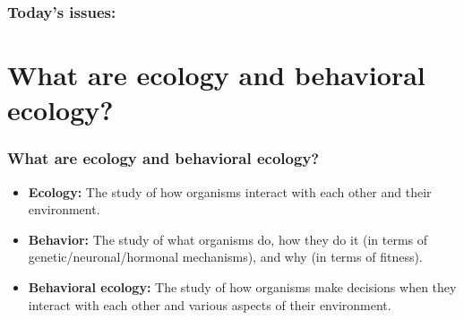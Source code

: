 \begin{noheadline}
\begin{frame}
\frametitle{Today's issues:}
\vspace{5mm}
\tableofcontents
\end{frame}
\end{noheadline}

\section[What are ecology and behavioral ecology?]{What are ecology and
    behavioral ecology?}

\begin{noheadline}
\begin{frame}[t]
    \frametitle{What are ecology and behavioral ecology?}
    \begin{adjustwidth}{-2em}{-1.5em}

        \begin{itemize}
            \item<1-> \textbf{Ecology:} The study of how organisms interact
                with each other and their environment.

                \vspace{4mm}
            \item<2-> \textbf{Behavior:} The study of what organisms do, how they
                do it (in terms of genetic/neuronal/hormonal mechanisms),
                and why (in terms of fitness).

                \vspace{4mm}
            \item<3-> \textbf{Behavioral ecology:} The study of how organisms
                make decisions when they interact with each other and various
                aspects of their environment.
        \end{itemize}
    \end{adjustwidth}
\end{frame}
\end{noheadline}

